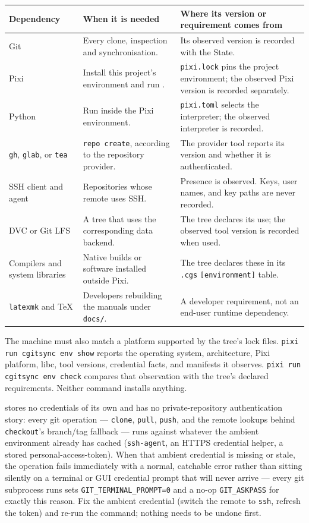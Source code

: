 \begin{center}
\begin{tabular}{lp{5.0cm}p{5.2cm}}
\textbf{Dependency} & \textbf{When it is needed} & \textbf{Where its version or requirement comes from} \\
\hline
Git & Every clone, inspection and synchronisation. & Its observed version is recorded with the State. \\
Pixi & Install this project's environment and run \cgscli{}. & \texttt{pixi.lock} pins the project environment; the observed Pixi version is recorded separately. \\
Python & Run \cgspkg{} inside the Pixi environment. & \texttt{pixi.toml} selects the interpreter; the observed interpreter is recorded. \\
\texttt{gh}, \texttt{glab}, or \texttt{tea} & \texttt{repo create}, according to the repository provider. & The provider tool reports its version and whether it is authenticated. \\
SSH client and agent & Repositories whose remote uses SSH. & Presence is observed. Keys, user names, and key paths are never recorded. \\
DVC or Git LFS & A tree that uses the corresponding data backend. & The tree declares its use; the observed tool version is recorded when used. \\
Compilers and system libraries & Native builds or software installed outside Pixi. & The tree declares these in its \texttt{.cgs} \texttt{[environment]} table. \\
\texttt{latexmk} and TeX & Developers rebuilding the manuals under \texttt{docs/}. & A developer requirement, not an end-user runtime dependency. \\
\end{tabular}
\end{center}

The machine must also match a platform supported by the tree's lock files.
\texttt{pixi run cgitsync env show} reports the operating system, architecture,
Pixi platform, libc, tool versions, credential facts, and manifests it
observes. \texttt{pixi run cgitsync env check} compares that observation
with the tree's declared requirements. Neither command installs anything.

\cgspkg{} stores no credentials of its own and has no private-repository
authentication story: every git operation --- \texttt{clone}, \texttt{pull},
\texttt{push}, and the remote lookups behind \texttt{checkout}'s branch/tag
fallback --- runs against whatever the ambient environment already has
cached (\texttt{ssh-agent}, an HTTPS credential helper, a stored
personal-access-token). When that ambient credential is missing or stale,
the operation fails immediately with a normal, catchable error rather than
sitting silently on a terminal or GUI credential prompt that will never
arrive --- every git subprocess \cgspkg{} runs sets
\texttt{GIT\_TERMINAL\_PROMPT=0} and a no-op \texttt{GIT\_ASKPASS} for
exactly this reason. Fix the ambient credential (switch the remote to
\texttt{ssh}, refresh the token) and re-run the command; nothing needs to
be undone first.

